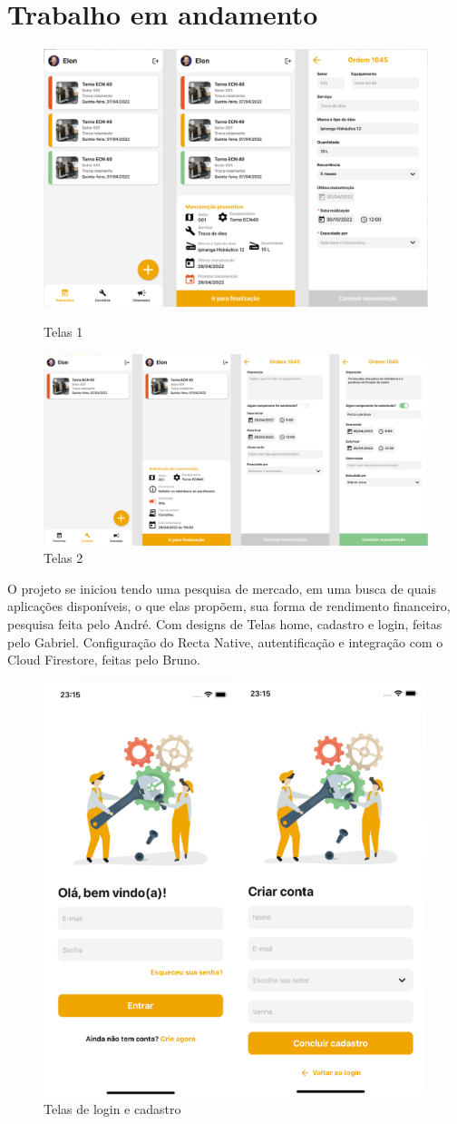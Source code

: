 \documentclass[%
  a4paper,%
  12pt,%
  english,%
  brazilian,%
]{article}
\begin{document}
\section{Trabalho em andamento}%
\begin{figure}[!htb]
  \includegraphics[width = 0.6\linewidth]{Figures/t1.PNG}
  \caption{Telas 1}
  \includegraphics[width = 0.6\linewidth]{Figures/t2.PNG}
  \caption{Telas 2}
\end{figure}


O projeto se iniciou tendo uma pesquisa de mercado, em uma busca de quais aplicações disponíveis, o que elas propõem, sua forma de rendimento financeiro, pesquisa feita pelo André. Com designs de Telas home, cadastro e login, feitas pelo Gabriel. Configuração do Recta Native, autentificação e integração com o Cloud Firestore, feitas pelo Bruno.



\begin{figure}[!h]
  \includegraphics[width = 0.35\linewidth]{Figures/t3.PNG}
  \caption{Telas de login e cadastro}
  \end{figure}
\end{document}
